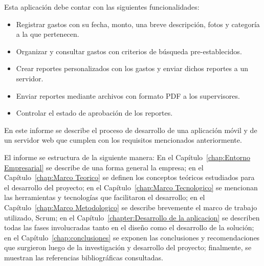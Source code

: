 

Esta aplicación debe contar con las siguientes funcionalidades:

\begin{itemize}
\item Registrar gastos con su fecha, monto, una breve descripción, fotos y categoría a la que pertenecen.
\item Organizar y consultar gastos con criterios de búsqueda pre-establecidos.
\item Crear reportes personalizados con los gastos y enviar dichos reportes a un servidor.
\item Enviar reportes mediante archivos con formato PDF a los supervisores.
\item Controlar el estado de aprobación de los reportes.
\end{itemize}

En este informe se describe el proceso de desarrollo de una aplicación móvil y de un servidor web que cumplen con los requisitos mencionados anteriormente.

El informe se estructura de la siguiente manera: En el Capítulo~\ref{chap:Entorno Empresarial} se describe de una forma general la empresa; en el Capítulo~\ref{chap:Marco Teorico} se definen los conceptos teóricos estudiados para el desarrollo del proyecto; en el Capítulo~\ref{chap:Marco Tecnologico} se mencionan las herramientas y tecnologías que facilitaron el desarrollo; en el Capítulo~\ref{chap:Marco Metodologico} se describe brevemente el marco de trabajo utilizado, Scrum; en el Capítulo~\ref{chapter:Desarrollo de la aplicacion} se describen todas las fases involucradas tanto en el diseño como el desarrollo de la solución; en el Capítulo~\ref{chap:conclusiones} se exponen las conclusiones y recomendaciones que surgieron luego de la investigación y desarrollo del proyecto; finalmente, se muestran las referencias bibliográficas consultadas.